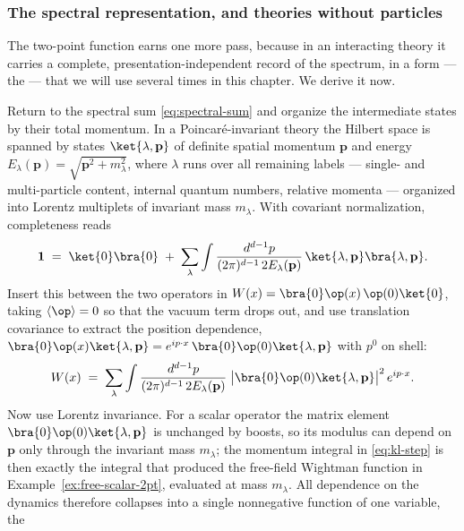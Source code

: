 \subsubsection{The spectral representation, and theories without particles}
\label{sec:kallen-lehmann}

The two-point function earns one more pass, because in an interacting
theory it carries a complete, presentation-independent record of the
spectrum, in a form --- the  ---
that we will use several times in this chapter. We derive it now.

Return to the spectral sum \eqref{eq:spectral-sum} and organize the
intermediate states by their total momentum. In a Poincar\'e-invariant theory
the Hilbert space is spanned by states $\ket{\lambda, \mathbf p}$ of definite
spatial momentum $\mathbf p$ and energy $E_\lambda(\mathbf p) = \sqrt{\mathbf
p^2 + m_\lambda^2}$, where $\lambda$ runs over all remaining labels ---
single- and multi-particle content, internal quantum numbers, relative
momenta --- organized into Lorentz multiplets of invariant mass $m_\lambda$.
With covariant normalization, completeness reads
\begin{equation}
\mathbf 1 \;=\; \ket{0}\bra{0} \;+\; \sum_\lambda \int
\frac{d^{d-1}p}{(2\pi)^{d-1}\, 2E_\lambda(\mathbf p)}\,
\ket{\lambda, \mathbf p}\bra{\lambda, \mathbf p}.
\label{eq:completeness}
\end{equation}
Insert this between the two operators in $W(x) =
\bra{0}\op(x)\,\op(0)\ket{0}$, taking $\langle \op \rangle = 0$ so that the
vacuum term drops out, and use translation covariance to extract the position
dependence, $\bra{0}\op(x)\ket{\lambda,\mathbf p} = e^{ip\cdot
x}\,\bra{0}\op(0)\ket{\lambda, \mathbf p}$ with $p^0$ on shell:
\begin{equation}
W(x) \;=\; \sum_\lambda \int
\frac{d^{d-1}p}{(2\pi)^{d-1}\,2E_\lambda(\mathbf p)}\;
\big|\bra{0}\op(0)\ket{\lambda,\mathbf p}\big|^2 \, e^{ip\cdot x}.
\label{eq:kl-step}
\end{equation}
Now use Lorentz invariance. For a scalar operator the matrix element
$\bra{0}\op(0)\ket{\lambda,\mathbf p}$ is unchanged by boosts, so its modulus
can depend on $\mathbf p$ only through the invariant mass $m_\lambda$; the
momentum integral in \eqref{eq:kl-step} is then exactly the integral that
produced the free-field Wightman function in
Example~\ref{ex:free-scalar-2pt}, evaluated at mass $m_\lambda$. All
dependence on the dynamics therefore collapses into a single nonnegative
function of one variable, the 
